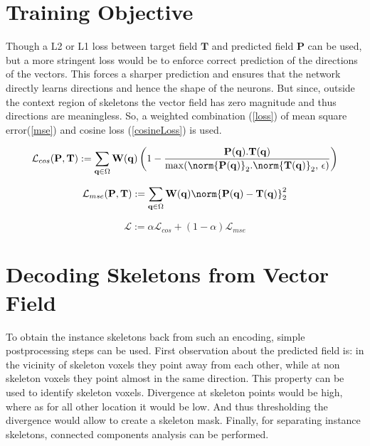 \section{Training Objective}
Though a L2 or L1 loss between target field $\mathbf{T}$ and predicted field $\mathbf{P}$ can be used, but a more stringent loss would be to enforce correct prediction of the directions of the vectors. This forces a sharper prediction and ensures that the network directly learns directions and hence the shape of the neurons. But since, outside the context region of skeletons the vector field has zero magnitude and thus directions are meaningless. So, a weighted combination (\autoref{loss}) of mean square error(\autoref{mse}) and cosine loss (\autoref{cosineLoss}) is used.

\begin{equation}\label{cosineLoss}
\mathcal{L}_{cos}(\mathbf{P}, \mathbf{T}) := \sum_{\mathbf{q} \in \Omega} \mathbf{W}(\mathbf{q})\left( 1 - \frac{\mathbf{P}(\mathbf{q}).\mathbf{T}(\mathbf{q})}{\max(\norm{\mathbf{P}(\mathbf{q})}_2.\norm{\mathbf{T}(\mathbf{q})}_2,\,\epsilon)} \right)
\end{equation}

\begin{equation} \label{mse}
\mathcal{L}_{mse}(\mathbf{P}, \mathbf{T}) := \sum_{\mathbf{q} \in \Omega} \mathbf{W}(\mathbf{q}) \norm{\mathbf{P}(\mathbf{q}) - \mathbf{T}(\mathbf{q})}_2^2
\end{equation}

\begin{equation} \label{loss}
\mathcal{L} := \alpha\mathcal{L}_{cos} + (1-\alpha)\mathcal{L}_{mse}
\end{equation}

\section{Decoding Skeletons from Vector Field}
To obtain the instance skeletons back from such an encoding, simple postprocessing steps can be used. First observation about the predicted field is: in the vicinity of skeleton voxels they point away from each other, while at non skeleton voxels they point almost in the same direction. This property can be used to identify skeleton voxels. Divergence at skeleton points would be high, where as for all other location it would be low. And thus thresholding the divergence would allow to create a skeleton mask. Finally, for separating instance skeletons, connected components analysis can be performed.

